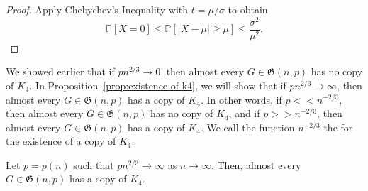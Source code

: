 \begin{proof}
    Apply Chebychev's Inequality with \(t = \mu/\sigma\)
    to obtain
    \begin{equation}
        \mathbb{P}[X=0] \leq \mathbb{P}[|X - \mu| \geq \mu] \leq \frac{\sigma^2}{\mu^2}.
    \end{equation}
\end{proof}

We showed earlier that if \(pn^{2/3} \to 0\), then almost every \(G \in \mathfrak{G}(n, p)\) has no copy of \(K_4\).
In Proposition~\ref{prop:existence-of-k4}, we will show that if \(pn^{2/3} \to \infty\), then almost every \(G \in \mathfrak{G}(n, p)\) has a copy of \(K_4\).
In other words, if \(p << n^{-2/3}\), then almost every \(G \in \mathfrak{G}(n, p)\) has no copy of \(K_4\), and if \(p >> n^{-2/3}\), then almost every \(G \in \mathfrak{G}(n, p)\) has a copy of \(K_4\).
We call the function \(n^{-2/3}\) the  for the existence of a copy of \(K_4\).

\begin{proposition} \label{prop:existence-of-k4}
    Let \(p = p(n)\) such that \(pn^{2/3} \to \infty\) as \(n \to \infty\).
    Then, almost every \(G \in \mathfrak{G}(n, p)\) has a copy of \(K_4\).
\end{proposition}

